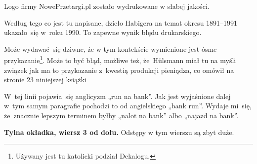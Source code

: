\documentclass[a4paper,11pt]{article}
\begin{document}
\vspace{\spaceTwo}







 Logo firmy NowePrzetargi.pl zostało wydrukowane w słabej jakości.

\vspace{\spaceFour}



 Według tego co jest tu napisane, dzieło Habigera na
temat okresu 1891--1991 ukazało~się w~roku 1990. To zapewne wynik błędu
drukarskiego.

\vspace{\spaceFour}



 Może wydawać~się dziwne, że w tym kontekście wymienione jest
ósme przykazanie\footnote{Używany jest tu katolicki podział Dekalogu.}. Może
to być błąd, możliwe też, że~H\"{u}lsmann miał tu na myśli związek jak ma to
przykazanie z~kwestią produkcji pieniądza, co omówił na stronie 23
niniejszej książki

\vspace{\spaceFour}



 W~tej linii pojawia~się anglicyzm „run na bank”. Jak jest
wyjaśnione dalej w~tym samym paragrafie pochodzi to od angielskiego „bank
run”. Wydaje mi~się, że~znacznie lepszym terminem byłby „nalot na bank” albo
„najazd na bank”.

\vspace{\spaceFour}



\textbf{Tylna okładka, wiersz 3 od dołu.} Odstępy w tym wierszu są
zbyt duże.








\end{document}
